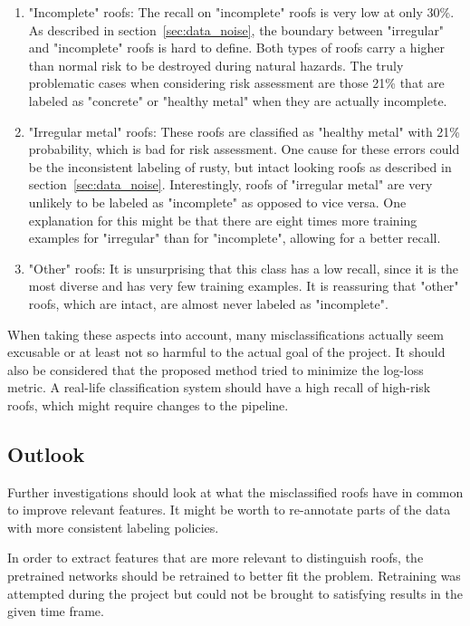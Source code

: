 \documentclass[11pt]{article}
\begin{document}
	\begin{enumerate}
		\item "Incomplete" roofs: The recall on "incomplete" roofs is very low at only 30\%. As described in section~\ref{sec:data_noise}, the boundary between "irregular" and "incomplete" roofs is hard to define. Both types of roofs carry a higher than normal risk to be destroyed during natural hazards. The truly problematic cases when considering risk assessment are those 21\% that are labeled as "concrete" or "healthy metal" when they are actually incomplete.
		
		\item "Irregular metal" roofs: These roofs are classified as "healthy metal" with 21\% probability, which is bad for risk assessment. One cause for these errors could be the inconsistent labeling of rusty, but intact looking roofs as described in section~\ref{sec:data_noise}. Interestingly, roofs of "irregular metal" are very unlikely to be labeled as "incomplete" as opposed to vice versa. One explanation for this might be that there are eight times more training examples for "irregular" than for "incomplete", allowing for a better recall.
		
		\item "Other" roofs: It is unsurprising that this class has a low recall, since it is the most diverse and has very few training examples. It is reassuring that "other" roofs, which are intact, are almost never labeled as "incomplete". 
	\end{enumerate}

	When taking these aspects into account, many misclassifications actually seem excusable or at least not so harmful to the actual goal of the project. It should also be considered that the proposed method tried to minimize the log-loss metric. A real-life classification system should have a high recall of high-risk roofs, which might require changes to the pipeline.
	
	\subsection{Outlook}
	
	Further investigations should look at what the misclassified roofs have in common to improve relevant features. It might be worth to re-annotate parts of the data with more consistent labeling policies.
	 
	In order to extract features that are more relevant to distinguish roofs, the pretrained networks should be retrained to better fit the problem. Retraining was attempted during the project but could not be brought to satisfying results in the given time frame.
	
\end{document}
